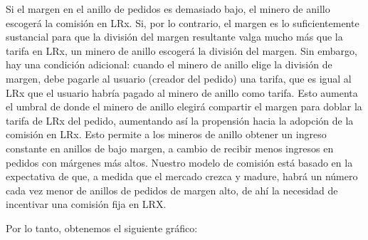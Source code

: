 \documentclass[UTF8,nofonts]{article}
\makeatletter
\newenvironment{figurehere}
 {\def\@captype{figure}}
 {}
\makeatother
\begin{document}
\begin{multicols}{2}
\begin{center}
\begin{figurehere}
\caption{Un 60\% de Margen Dividido}
\label{fig:marginsplit}
\end{figurehere}
\end{center}
Si el margen en el anillo de pedidos es demasiado bajo, el minero de anillo escoger\'a la comisi\'on en LRx. Si, por lo contrario, el margen es lo suficientemente sustancial para que la divisi\'on del margen resultante valga mucho m\'as que la tarifa en LRx, un minero de anillo escoger\'a la divisi\'on del margen. Sin embargo, hay una condici\'on adicional: cuando el minero de anillo elige la divisi\'on de margen, debe pagarle al usuario (creador del pedido) una tarifa, que es igual al LRx que el usuario habr\'ia pagado al minero de anillo como tarifa. Esto aumenta el umbral de donde el minero de anillo elegir\'a compartir el margen para doblar la tarifa de LRx del pedido, aumentando as\'i la propensi\'on hacia la adopci\'on de la comisi\'on en LRx. Esto permite a los mineros de anillo obtener un ingreso constante en anillos de bajo margen, a cambio de recibir menos ingresos en pedidos con m\'argenes m\'as altos. Nuestro modelo de comisi\'on est\'a basado en la expectativa de que, a medida que el mercado crezca y madure, habr\'a un n\'umero cada vez menor de anillos de pedidos de margen alto, de ah\'i la necesidad de incentivar una comisi\'on fija en LRX.

Por lo tanto, obtenemos el siguiente gr\'afico: 

\begin{center}
\begin{figurehere}
\centering
{}
\caption{Loopring's Fee Model}
\label{fig:feemodel}
\end{figurehere}
\end{center}


\end{multicols}
\end{document}
